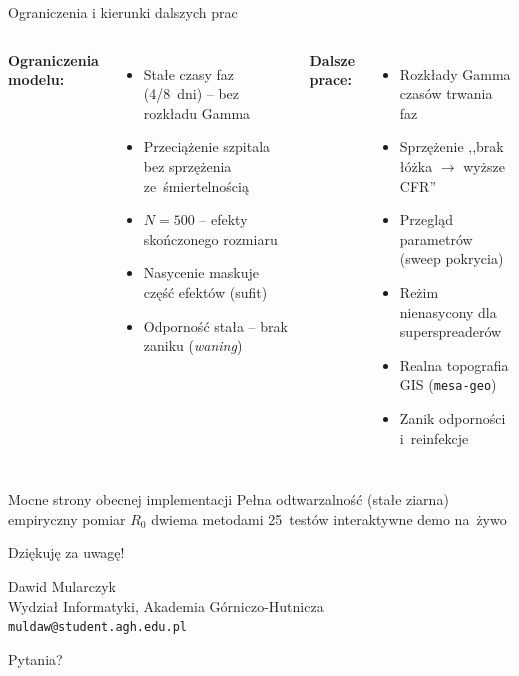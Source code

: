 \documentclass[aspectratio=1610, polish]{beamer}
\begin{document}
\begin{frame}{Ograniczenia i kierunki dalszych prac}
  \begin{columns}[T]
    \textbf{Ograniczenia modelu:}
    \begin{itemize}
      \item Stałe czasy faz (4/8~dni) -- bez rozkładu Gamma
      \item Przeciążenie szpitala bez sprzężenia ze~śmiertelnością
      \item $N=500$ -- efekty skończonego rozmiaru
      \item Nasycenie maskuje część efektów (sufit)
      \item Odporność stała -- brak zaniku (\textit{waning})
    \end{itemize}

    \textbf{Dalsze prace:}
    \begin{itemize}
      \item Rozkłady Gamma czasów trwania faz
      \item Sprzężenie ,,brak łóżka $\to$ wyższe CFR''
      \item Przegląd parametrów (sweep pokrycia)
      \item Reżim nienasycony dla superspreaderów
      \item Realna topografia GIS (\texttt{mesa-geo})
      \item Zanik odporności i~reinfekcje
    \end{itemize}
  \end{columns}

  \vspace{0.4cm}
  \begin{block}{Mocne strony obecnej implementacji}
    Pełna odtwarzalność (stałe ziarna) \textbullet{} empiryczny pomiar $R_0$
    dwiema metodami \textbullet{} 25~testów \textbullet{} interaktywne demo na~żywo
  \end{block}
\end{frame}

\begin{frame}[plain]
  \vfill
  \begin{center}
    {\Huge Dziękuję za uwagę!}

    \vspace{1.2cm}

    {\large Dawid Mularczyk}\\[4pt]
    {\small Wydział Informatyki, Akademia Górniczo-Hutnicza}\\[4pt]
    {\small \texttt{muldaw@student.agh.edu.pl}}

    \vspace{1cm}
    {\normalsize Pytania?}
  \end{center}
  \vfill
\end{frame}
\end{document}

